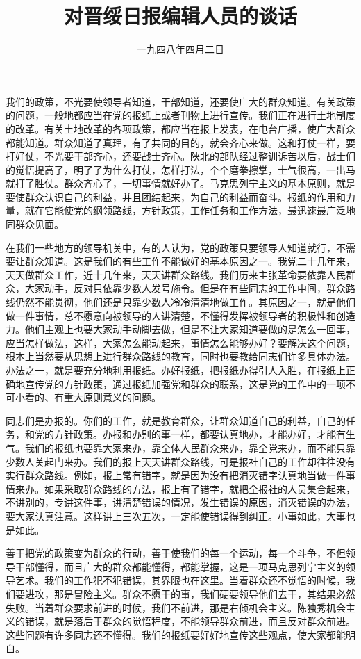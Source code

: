 
\title{对晋绥日报编辑人员的谈话}
\date{一九四八年四月二日}
\maketitle


我们的政策，不光要使领导者知道，干部知道，还要使广大的群众知道。有关政策的问题，一般地都应当在党的报纸上或者刊物上进行宣传。我们正在进行土地制度的改革。有关土地改革的各项政策，都应当在报上发表，在电台广播，使广大群众都能知道。群众知道了真理，有了共同的目的，就会齐心来做。这和打仗一样，要打好仗，不光要干部齐心，还要战士齐心。陕北的部队经过整训诉苦以后，战士们的觉悟提高了，明了了为什么打仗，怎样打法，个个磨拳擦掌，士气很高，一出马就打了胜仗。群众齐心了，一切事情就好办了。马克思列宁主义的基本原则，就是要使群众认识自己的利益，并且团结起来，为自己的利益而奋斗。报纸的作用和力量，就在它能使党的纲领路线，方针政策，工作任务和工作方法，最迅速最广泛地同群众见面。

在我们一些地方的领导机关中，有的人认为，党的政策只要领导人知道就行，不需要让群众知道。这是我们的有些工作不能做好的基本原因之一。我党二十几年来，天天做群众工作，近十几年来，天天讲群众路线。我们历来主张革命要依靠人民群众，大家动手，反对只依靠少数人发号施令。但是在有些同志的工作中间，群众路线仍然不能贯彻，他们还是只靠少数人冷冷清清地做工作。其原因之一，就是他们做一件事情，总不愿意向被领导的人讲清楚，不懂得发挥被领导者的积极性和创造力。他们主观上也要大家动手动脚去做，但是不让大家知道要做的是怎么一回事，应当怎样做法，这样，大家怎么能动起来，事情怎么能够办好？要解决这个问题，根本上当然要从思想上进行群众路线的教育，同时也要教给同志们许多具体办法。办法之一，就是要充分地利用报纸。办好报纸，把报纸办得引人入胜，在报纸上正确地宣传党的方针政策，通过报纸加强党和群众的联系，这是党的工作中的一项不可小看的、有重大原则意义的问题。

同志们是办报的。你们的工作，就是教育群众，让群众知道自己的利益，自己的任务，和党的方针政策。办报和办别的事一样，都要认真地办，才能办好，才能有生气。我们的报纸也要靠大家来办，靠全体人民群众来办，靠全党来办，而不能只靠少数人关起门来办。我们的报上天天讲群众路线，可是报社自己的工作却往往没有实行群众路线。例如，报上常有错字，就是因为没有把消灭错字认真地当做一件事情来办。如果采取群众路线的方法，报上有了错字，就把全报社的人员集合起来，不讲别的，专讲这件事，讲清楚错误的情况，发生错误的原因，消灭错误的办法，要大家认真注意。这样讲上三次五次，一定能使错误得到纠正。小事如此，大事也是如此。

善于把党的政策变为群众的行动，善于使我们的每一个运动，每一个斗争，不但领导干部懂得，而且广大的群众都能懂得，都能掌握，这是一项马克思列宁主义的领导艺术。我们的工作犯不犯错误，其界限也在这里。当着群众还不觉悟的时候，我们要进攻，那是冒险主义。群众不愿干的事，我们硬要领导他们去干，其结果必然失败。当着群众要求前进的时候，我们不前进，那是右倾机会主义。陈独秀机会主义的错误，就是落后于群众的觉悟程度，不能领导群众前进，而且反对群众前进。这些问题有许多同志还不懂得。我们的报纸要好好地宣传这些观点，使大家都能明白。

